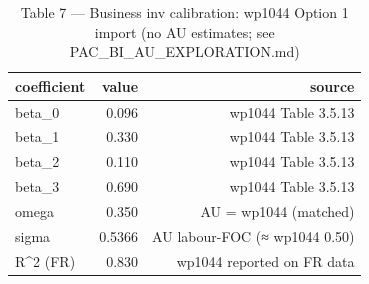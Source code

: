 \begin{table}[ht]
\centering
\caption{Table 7 — Business inv calibration: wp1044 Option 1 import (no AU estimates; see PAC_BI_AU_EXPLORATION.md)}
\begin{tabular}{lrr}
\toprule
coefficient & value & source \\
\midrule
beta_0 & 0.096 & wp1044 Table 3.5.13 \\
beta_1 & 0.330 & wp1044 Table 3.5.13 \\
beta_2 & 0.110 & wp1044 Table 3.5.13 \\
beta_3 & 0.690 & wp1044 Table 3.5.13 \\
omega & 0.350 & AU = wp1044 (matched) \\
sigma & 0.5366 & AU labour-FOC (≈ wp1044 0.50) \\
R^2 (FR) & 0.830 & wp1044 reported on FR data \\
\bottomrule
\end{tabular}
\end{table}
